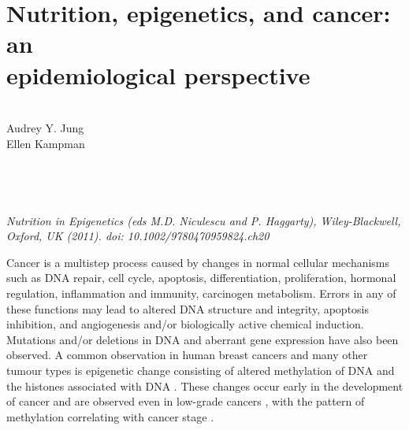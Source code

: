 \chapter[Nutrition, epigenetics, and cancer: an epidemiological perspective]{Nutrition, epigenetics, and cancer: an \\ epidemiological perspective}
\label{chap2_Nutritionepigeneticscancer: an epidemiologicalperspective}


\quad\\ 
 
\noindent 
Audrey Y. Jung\\ 
Ellen Kampman\\ 
 
\quad\\ 
 
\quad\\ 
 
\quad\\ 
 
\quad\\ 
 
\noindent \emph{Nutrition in Epigenetics (eds M.D. Niculescu and P. Haggarty), Wiley-Blackwell, Oxford, UK (2011). doi: 10.1002/9780470959824.ch20} 
 
\newpage 
 
\noindent Cancer is a multistep process caused by changes in normal cellular mechanisms such as DNA repair, cell cycle, apoptosis, differentiation, proliferation, hormonal regulation, inflammation and immunity, carcinogen metabolism. Errors in any of these functions may lead to altered DNA structure and integrity, apoptosis inhibition, and angiogenesis and/or biologically active chemical induction. Mutations and/or deletions in DNA and aberrant gene expression have also been observed. A common observation in human breast cancers and many other tumour types is epigenetic change consisting of altered methylation of DNA \cite{c21,c22,c23,c24,c25} and the histones associated with DNA \cite{c26,c27,c28}. These changes occur early in the development of cancer and are observed even in low-grade cancers \cite{c29}, with the pattern of methylation correlating with cancer stage \cite{c210}.

